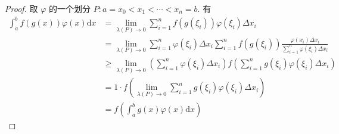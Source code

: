 \documentclass{article}
\newcommand{\dd}{\mathrm{d}}
\newcommand{\dx}{\dd x}
\begin{document}
\begin{proof}
    取 $\varphi$ 的一个划分 $P: a = x_0 < x_1 < \cdots < x_n = b$. 有
    \begin{align*}
        \int_{a}^{b}f(g(x))\varphi(x)\dx &= \lim_{\lambda(P) \to 0}\sum_{i = 1}^{n}f(g(\xi_i))\varphi(\xi_i) \Delta x_i \\
        &= \lim_{\lambda(P) \to 0}\sum_{i = 1}^{n}\varphi(\xi_i) \Delta x_i \sum_{i = 1}^{n}f(g(\xi_i))\frac{\varphi(x_i) \Delta x_i}{\sum_{i = 1}^{n}\varphi(\xi_i) \Delta x_i} \\
        &\geqslant \lim_{\lambda(P) \to 0}\left(\sum_{i = 1}^{n}\varphi(\xi_i) \Delta x_i\right) f\left(\sum_{i = 1}^{n}g(\xi_i)\varphi(\xi_i)\Delta x_i\right)  \\
        &= 1 \cdot f\left(\lim_{\lambda(P) \to 0}\sum_{i = 1}^{n}g(\xi_i)\varphi(\xi_i)\Delta x_i\right)\\
        &= f\left(\int_{a}^{b}g(x)\varphi(x) \dx\right)
    \end{align*}
\end{proof}
\end{document}
